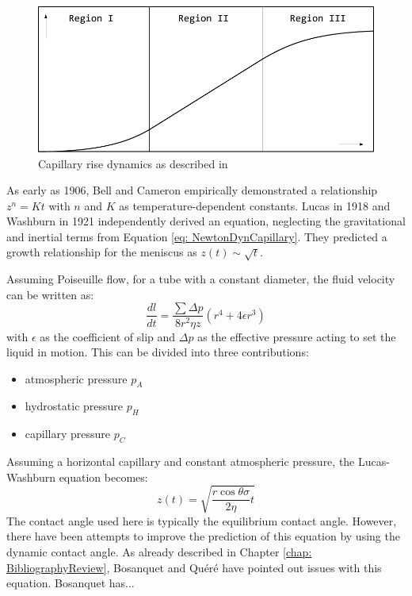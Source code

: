 \begin{figure}[h]
    \centering
    \includegraphics[width=.95\textwidth]{Pictures/CapillaryRise.pdf}
    \caption{Capillary rise dynamics as described in \cite{stange2003CapillaryDrivenFlow}}
    \label{fig: capillaryRise}
\end{figure}


As early as 1906, Bell and Cameron \cite{bell1906FlowLiquidsCapillary} empirically demonstrated a relationship $z^n=Kt$ with $n$ and $K$ as temperature-dependent constants. Lucas \cite{lucas1918UeberZeitgesetzKapillaren} in 1918 and Washburn \cite{washburn1921DynamicsCapillaryFlow} in 1921 independently derived an equation, neglecting the gravitational and inertial terms from Equation \ref{eq: NewtonDynCapillary}. They predicted a growth relationship for the meniscus as $z(t)\sim \sqrt{t}$.

Assuming Poiseuille flow, for a tube with a constant diameter, the fluid velocity can be written as:
\begin{equation}
    \frac{dl}{dt}= \frac{\sum \Delta p}{8r^{2}\eta z}(r^{4}+ 4\epsilon r^{3})
\end{equation}
with $\epsilon$ as the coefficient of slip and $\Delta p$ as the effective pressure acting to set the liquid in motion. This can be divided into three contributions:
\begin{itemize}
    \item atmospheric pressure $p_A$
    \item hydrostatic pressure $p_H$
    \item capillary pressure $p_C$
\end{itemize}
Assuming a horizontal capillary and constant atmospheric pressure, the Lucas-Washburn equation becomes:
\begin{equation}
    z(t)=\sqrt{\frac{r\cos\theta \sigma}{2\eta}t}
\end{equation}
The contact angle used here is typically the equilibrium contact angle. However, there have been attempts to improve the prediction of this equation by using the dynamic contact angle. 
As already described in Chapter \ref{chap: BibliographyReview}, Bosanquet\cite{bosanquet1923LVFlowLiquids} and Quéré\cite{quere1997InertialCapillarity} have pointed out issues with this equation. Bosanquet has...
